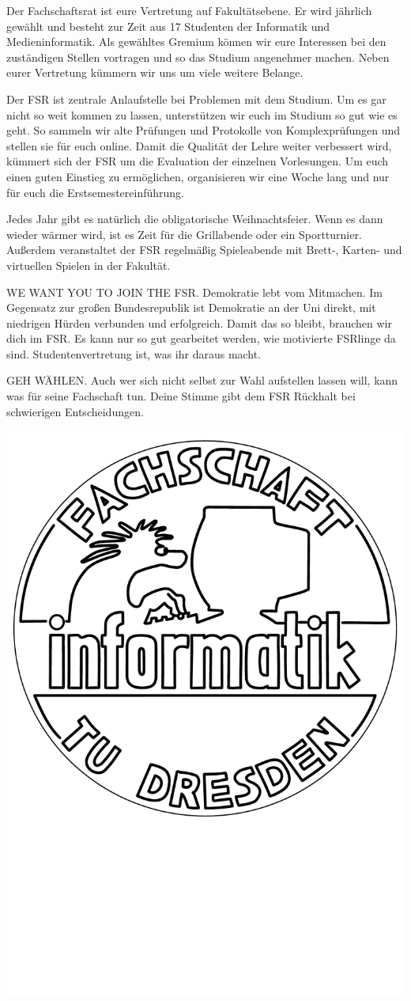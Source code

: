 
Der Fachschaftsrat ist eure Vertretung auf Fakultätsebene.
Er wird jährlich gewählt und besteht zur Zeit aus 17 Studenten der Informatik und Medieninformatik.
Als gewähltes Gremium können wir eure Interessen bei den zuständigen Stellen vortragen und so das Studium angenehmer machen.
Neben eurer Vertretung kümmern wir uns um viele weitere Belange.

Der FSR ist zentrale Anlaufstelle bei Problemen mit dem Studium.
Um es gar nicht so weit kommen zu lassen, unterstützen wir euch im Studium so gut wie es geht.
So sammeln wir alte Prüfungen und Protokolle von Komplexprüfungen und stellen sie für euch online.
Damit die Qualität der Lehre weiter verbessert wird, kümmert sich der FSR um die Evaluation der einzelnen Vorlesungen.
Um euch einen guten Einstieg zu ermöglichen, organisieren wir eine Woche lang und nur für euch die Erstsemestereinführung.

Jedes Jahr gibt es natürlich die obligatorische Weihnachtsfeier.
Wenn es dann wieder wärmer wird, ist es Zeit für die Grillabende oder ein Sportturnier. \\
Außerdem veranstaltet der FSR regelmäßig Spieleabende mit Brett-, Karten- und virtuellen Spielen in der Fakultät.

WE WANT YOU TO JOIN THE FSR.
Demokratie lebt vom Mitmachen.
Im Gegensatz zur großen Bundesrepublik ist Demokratie an der Uni direkt, mit niedrigen Hürden verbunden und erfolgreich.
Damit das so bleibt, brauchen wir dich im FSR.
Es kann nur so gut gearbeitet werden, wie motivierte FSRlinge da sind.
Studentenvertretung ist, was ihr daraus macht.

GEH WÄHLEN.
Auch wer sich nicht selbst zur Wahl aufstellen lassen will, kann was für seine Fachschaft tun.
Deine Stimme gibt dem FSR Rückhalt bei schwierigen Entscheidungen.

\includegraphics[width=.5\linewidth]{img/fsr_logo}

